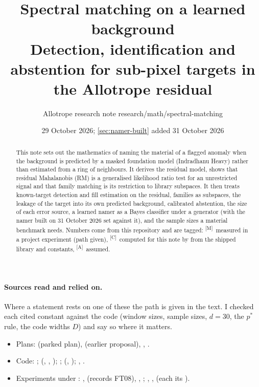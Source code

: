 \documentclass[11pt,a4paper]{article}
\title{Spectral matching on a learned background\\[4pt]
  \large Detection, identification and abstention for sub-pixel targets in the Allotrope residual}
\author{Allotrope research note \quad\textperiodcentered\quad research/math/spectral-matching}
\date{29 October 2026; \cref{sec:namer-built} added 31 October 2026}
\theoremstyle{plain}
\theoremstyle{definition}
\theoremstyle{remark}
\newcommand{\meas}{\textsuperscript{\textsf{\scriptsize[M]}}}
\newcommand{\comp}{\textsuperscript{\textsf{\scriptsize[C]}}}
\newcommand{\assm}{\textsuperscript{\textsf{\scriptsize[A]}}}
\begin{document}
\maketitle

\begin{abstract}
\noindent
This note sets out the mathematics of naming the material of a flagged anomaly when the background is predicted
by a masked foundation model (Indradhanu Heavy) rather than estimated from a ring of neighbours. It derives the
residual model, shows that residual Mahalanobis (RM) is a generalised likelihood ratio test for an unrestricted
signal and that family matching is its restriction to library subspaces. It then treats known-target detection
and fill estimation on the residual, families as subspaces, the leakage of the target into its own predicted
background, calibrated abstention, the size of each error source, a learned namer as a Bayes classifier under
a generator (with the namer built on 31 October 2026 set against it), and the sample sizes a material benchmark needs. Numbers come from this repository and are tagged:
\meas\ measured in a project experiment (path given), \comp\ computed for this note by
 from the shipped library and constants, \assm\ assumed.
\end{abstract}

\tableofcontents
\bigskip

\paragraph{Sources read and relied on.} Where a statement rests on one of these the path is given in the text. I
checked each cited constant against the code (window sizes, sample sizes, $d=30$, the $p^\ast$ rule, the code
widths $D$) and say so where it matters.
{\small\raggedright
\begin{itemize}[leftmargin=1.2em,itemsep=0pt]
\item Plans:  (parked plan),
   (earlier proposal),
  , .
\item Code: ;
   (, , );
  ;
   (, );
  , .
\item Experiments under : ,
   (records FT08), , ;
  , ,  (each its ).
\end{itemize}}
\end{document}
